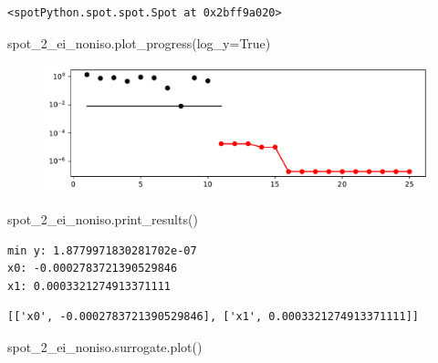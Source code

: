 \documentclass[
  letterpaper,
  DIV=11,
  numbers=noendperiod]{scrreprt}
\newenvironment{Shaded}{\begin{snugshade}}{\end{snugshade}}
\newcommand{\NormalTok}[1]{\textcolor[rgb]{0.00,0.23,0.31}{#1}}
\newcommand{\OperatorTok}[1]{\textcolor[rgb]{0.37,0.37,0.37}{#1}}
\newcommand{\VariableTok}[1]{\textcolor[rgb]{0.07,0.07,0.07}{#1}}
\begin{document}
\begin{verbatim}
<spotPython.spot.spot.Spot at 0x2bff9a020>
\end{verbatim}

\begin{Shaded}
\begin{Highlighting}[]
\NormalTok{spot\_2\_ei\_noniso.plot\_progress(log\_y}\OperatorTok{=}\VariableTok{True}\NormalTok{)}
\end{Highlighting}
\end{Shaded}

\begin{figure}[H]

{\centering \includegraphics{07_spot_ei_files/figure-pdf/cell-15-output-1.pdf}

}

\end{figure}

\begin{Shaded}
\begin{Highlighting}[]
\NormalTok{spot\_2\_ei\_noniso.print\_results()}
\end{Highlighting}
\end{Shaded}

\begin{verbatim}
min y: 1.8779971830281702e-07
x0: -0.0002783721390529846
x1: 0.0003321274913371111
\end{verbatim}

\begin{verbatim}
[['x0', -0.0002783721390529846], ['x1', 0.0003321274913371111]]
\end{verbatim}

\begin{Shaded}
\begin{Highlighting}[]
\NormalTok{spot\_2\_ei\_noniso.surrogate.plot()}
\end{Highlighting}
\end{Shaded}
\end{document}
